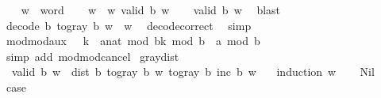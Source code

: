 \begin{isabellebody}
\ \ \isamarkupfalse%
\ w\ {\isacharcolon}{\kern0pt}{\isacharcolon}{\kern0pt}\ word\isanewline
\ \ \isamarkupfalse%
\ {\isachardoublequoteopen}w\ {\isasymin}\ {\isacharbraceleft}{\kern0pt}w{\isachardot}{\kern0pt}\ valid\ b\ w{\isacharbraceright}{\kern0pt}{\isachardoublequoteclose}\isanewline
\ \ \isamarkupfalse%
\ {\isachardoublequoteopen}valid\ b\ w{\isachardoublequoteclose}\ \isamarkupfalse%
\ blast\isanewline
\ \ \isamarkupfalse%
\ {\isachardoublequoteopen}decode\ b\ {\isacharparenleft}{\kern0pt}to{\isacharunderscore}{\kern0pt}gray\ b\ w{\isacharparenright}{\kern0pt}\ {\isacharequal}{\kern0pt}\ w{\isachardoublequoteclose}\ \isamarkupfalse%
\ decode{\isacharunderscore}{\kern0pt}correct\ \isamarkupfalse%
\ simp\isanewline
{}\isamarkupfalse%
%
\endisatagproof
{\isafoldproof}%
%
\isadelimproof
\isanewline
%
\endisadelimproof
\isanewline
{}\isamarkupfalse%
\ mod{\isacharunderscore}{\kern0pt}mod{\isacharunderscore}{\kern0pt}aux{\isacharcolon}{\kern0pt}\ {\isachardoublequoteopen}{}\ {\isasymle}\ k\ {\isasymLongrightarrow}\ {\isacharparenleft}{\kern0pt}a{\isacharcolon}{\kern0pt}{\isacharcolon}{\kern0pt}nat{\isacharparenright}{\kern0pt}\ mod\ b{\isacharcircum}{\kern0pt}k\ mod\ b\ {\isacharequal}{\kern0pt}\ a\ mod\ b{\isachardoublequoteclose}\isanewline
%
\isadelimproof
\ \ %
\endisadelimproof
%
\isatagproof
{}\isamarkupfalse%
\ {\isacharparenleft}{\kern0pt}simp\ add{\isacharcolon}{\kern0pt}\ mod{\isacharunderscore}{\kern0pt}mod{\isacharunderscore}{\kern0pt}cancel{\isacharparenright}{\kern0pt}%
\endisatagproof
{\isafoldproof}%
%
\isadelimproof
\isanewline
%
\endisadelimproof
\isanewline
{}\isamarkupfalse%
\ gray{\isacharunderscore}{\kern0pt}dist{\isacharcolon}{\kern0pt}\isanewline
\ \ {\isachardoublequoteopen}valid\ b\ w\ {\isasymLongrightarrow}\ dist\ b\ {\isacharparenleft}{\kern0pt}to{\isacharunderscore}{\kern0pt}gray\ b\ w{\isacharparenright}{\kern0pt}\ {\isacharparenleft}{\kern0pt}to{\isacharunderscore}{\kern0pt}gray\ b\ {\isacharparenleft}{\kern0pt}inc\ b\ w{\isacharparenright}{\kern0pt}{\isacharparenright}{\kern0pt}\ {\isasymle}\ {}{\isachardoublequoteclose}\isanewline
%
\isadelimproof
%
\endisadelimproof
%
\isatagproof
{}\isamarkupfalse%
\ {\isacharparenleft}{\kern0pt}induction\ w{\isacharparenright}{\kern0pt}\isanewline
\ \ \isamarkupfalse%
\ Nil\ \isamarkupfalse%
\ {\isacharquery}{\kern0pt}case\ \isamarkupfalse%

\end{isabellebody}
